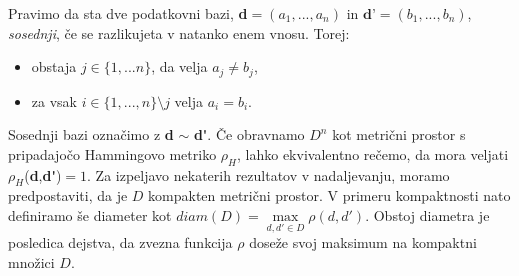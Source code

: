 \documentclass[mat1]{article}
\theoremstyle{definition}
\begin{document}
\newline
\newline
Pravimo da sta dve podatkovni bazi, \textbf{d}$= (a_{1},...,a_{n})$ in $\textbf{d'}= (b_{1},...,b_{n})$,  \textit{sosednji}, če se razlikujeta v natanko enem vnosu. Torej:
\begin{itemize}
\item obstaja $j\in\{1,...n\}$, da velja $a_{j} \neq b_{j}$,
\item za vsak $i\in\{1,...,n\} \setminus j$ velja $a_{i} = b_{i}$.
\end{itemize}
Sosednji bazi označimo z \textbf{d} $\sim$ \textbf{d\'}. Če obravnamo $D^n$ kot metrični prostor s pripadajočo Hammingovo metriko $\rho_{H}$, lahko ekvivalentno rečemo, da mora veljati $\rho_{H}$(\textbf{d},\textbf{d\'})$=1$.
\newline
\newline
Za izpeljavo nekaterih rezultatov v nadaljevanju, moramo predpostaviti, da je $D$ kompakten metrični prostor. V primeru kompaktnosti nato definiramo še diameter kot $diam(D) = \max\limits_{d,d' \in D}\rho(d,d')$. Obstoj diametra je posledica dejstva, da zvezna funkcija $\rho$ doseže svoj maksimum na kompaktni množici $D$.
\end{document}
